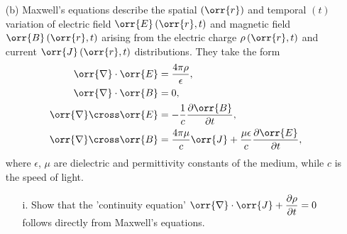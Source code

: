 \documentclass{article}
\begin{document}
{\begin{enumerate}
\begin{enumerate}
				\paragraph{Solution} \unboldmath  
				\begin{equation*}
					\begin{split}
						\left[ \orr{\nabla} \cross \left( \orr{\nabla} \cross \orr{V} \right) \right]_i &= \epsilon_{ijk} \partial_j \left( \orr{\nabla} \cross \orr{V} \right)_k = \epsilon_{ijk} \partial_j \epsilon_{klm} \partial_l V_m \\
						&= \epsilon_{ijk} \epsilon_{klm} \partial_j \partial_l V_m = \left( \delta{il} \delta_{jm} - \delta_{im} \delta_{jl} \right) \partial_j \partial_l V_m \\
						&= \partial_i \partial_j V_j - \partial_j \partial_j V_i = \nabla_i \left( \orr{\nabla} \cdot \orr{V} \right) - \orr{\nabla} \cdot \orr{\nabla} V_i \\
						&= \orr{\nabla} \left( \orr{\nabla} \cdot \orr{V} \right) - \nabla^2 \orr{V}
					\end{split}
				\end{equation*} \boldmath
			\end{enumerate}
			\item[(b)] Maxwell's equations describe the spatial $\left( \orr{r} \right)$ and temporal $\left( t \right)$ variation of electric field $\orr{E}\left( \orr{r},t \right)$ and magnetic field $\orr{B}\left( \orr{r},t \right)$ arising from the electric charge $\rho\left( \orr{r},t \right)$ and current $\orr{J}\left( \orr{r},t \right)$ distributions. They take the form
			\begin{equation*}
				\begin{split}
					\orr{\nabla} \cdot \orr{E} &= \frac{4\pi \rho}{\epsilon}, \\
					\orr{\nabla} \cdot \orr{B} &= 0, \\
					\orr{\nabla} \cross \orr{E} &= -\frac{1}{c} \frac{\partial \orr{B}}{\partial t}, \\
					\orr{\nabla} \cross \orr{B} &= \frac{4\pi \mu}{c} \orr{J} + \frac{\mu \epsilon}{c} \frac{\partial \orr{E}}{\partial t},
				\end{split}
			\end{equation*}
			where $\epsilon$, $\mu$ are dielectric and permittivity constants of the medium, while $c$ is the speed of light. \\
			\begin{enumerate}
				\item[i.] Show that the 'continuity equation' $\displaystyle \orr{\nabla} \cdot \orr{J} + \frac{\partial \rho}{\partial t} = 0$ follows directly from Maxwell's equations.

\end{enumerate}
\end{enumerate}}
\end{document}
